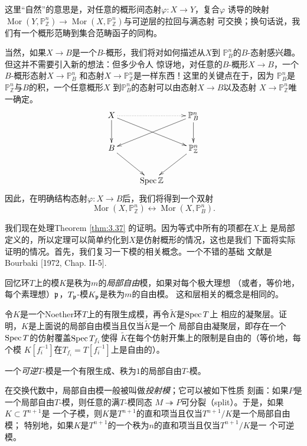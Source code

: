这里“自然”的意思是，对任意的概形间态射$\varphi:X\to Y$，复合$\varphi$
诱导的映射$\operatorname{Mor}(Y,\mathbb P_{\mathbb Z}^n)\to 
\operatorname{Mor}(X,\mathbb P_{\mathbb Z}^n)$与可逆层的拉回与满态射
可交换；换句话说，我们有一个概形范畴到集合范畴函子的同构。

当然，如果$X\to B$是一个$B$-概形，我们将对如何描述从$X$到
$\mathbb P_B^n$的$B$-态射感兴趣。但这并不需要引入新的想法：但多少令人
惊讶地，对任意的$B$-概形$X\to B$，一个$B$-概形态射$X\to \mathbb P_B^n$
和态射$X\to \mathbb P_{\mathbb Z}^n$是一样东西！这里的关键点在于，因为
$\mathbb P_{B}^n$是$\mathbb P_{\mathbb Z}^n$与$B$的积，一个任意概形$X$
到$\mathbb P_B^n$的态射可以由态射$X\to B$以及态射
$X\to \mathbb P^n_{\mathbb Z}$唯一确定。
\[
	\xymatrix{
		X\ar[d]\ar[drr]\ar@{.>}[rr]&&\mathbb P_B^n\ar[d]\ar[lld]\\
		B\ar[dr]&&\mathbb P_{\mathbb Z}^n\ar[dl]\\
		&\spec \mathbb Z&
	}
\]
因此，在明确结构态射$\varphi:X\to B$后，我们将得到一个双射
\[
	\operatorname{Mor}(X,\mathbb P_{\mathbb Z}^n)\leftrightarrow
	\operatorname{Mor}(X,\mathbb P_{B}^n).
\]

我们现在处理Theorem \ref{thm:3.37} 的证明。因为等式中所有的项都在$X$上
是局部定义的，所以定理可以简单约化到$X$是仿射概形的情况，这也是我们
下面将实际证明的情况。首先，我们复习一下模的相关概念。一个不错的基础
文献是Bourbaki [1972, Chap. II-5].

回忆环$T$上的模$K$是秩为$m$的\textit{局部自由}模，如果对每个极大理想
（或者，等价地，每个素理想）$\mathfrak{p}$，$T_{\mathfrak{p}}$-模$K_{\mathfrak{p}}$是秩为$m$的自由模。
这和层相关的概念是相同的。

\begin{exe}\label{exe:3.38}
	令$K$是一个Noether环$T$上的有限生成模，再令$\tilde K$是$\operatorname{Spec} T$上
	相应的凝聚层。证明，$K$是上面说的局部自由模当且仅当$\tilde K$是一个
	局部自由凝聚层，即存在一个$\operatorname{Spec} T$的仿射覆盖$\operatorname{Spec} T_{f_i}$使得
	$\tilde K$在每个仿射开集上的限制是自由的（等价地，每个模
	$K[f_i^{-1}]$在$T_{f_i}=T[f_i^{-1}]$上是自由的）。
\end{exe}

一个\textit{可逆}$T$-模是一个有限生成、秩为$1$的局部自由$T$-模。

在交换代数中，局部自由模一般被叫做\textit{投射模}；它可以被如下性质
刻画：如果$P$是一个局部自由$T$-模，则任意的满$T$-模同态
$M\twoheadrightarrow P$可分裂（split）。于是，如果$K\subset T^{n+1}$是
一个子模，则$K$是$T^{n+1}$的直和项当且仅当$T^{n+1}/K$是一个局部自由模；
特别地，如果$K$是$T^{n+1}$的一个秩为$n$的直和项当且仅当$T^{n+1}/K$是一
个可逆模。

